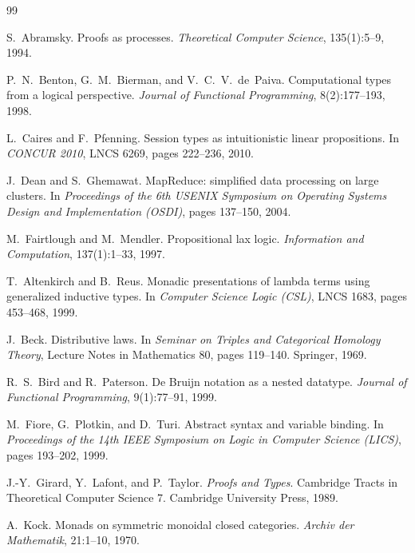 \documentclass[11pt]{article}
\theoremstyle{branddef}
\theoremstyle{brandplain}
\theoremstyle{brandrem}
\begin{document}
\begin{thebibliography}{99}\small\raggedright

S.~Abramsky.
\newblock Proofs as processes.
\newblock \emph{Theoretical Computer Science}, 135(1):5--9, 1994.

P.~N.~Benton, G.~M.~Bierman, and V.~C.~V.~de~Paiva.
\newblock Computational types from a logical perspective.
\newblock \emph{Journal of Functional Programming}, 8(2):177--193, 1998.

L.~Caires and F.~Pfenning.
\newblock Session types as intuitionistic linear propositions.
\newblock In \emph{CONCUR 2010}, LNCS 6269, pages 222--236, 2010.

J.~Dean and S.~Ghemawat.
\newblock MapReduce: simplified data processing on large clusters.
\newblock In \emph{Proceedings of the 6th USENIX Symposium on Operating Systems
Design and Implementation (OSDI)}, pages 137--150, 2004.

M.~Fairtlough and M.~Mendler.
\newblock Propositional lax logic.
\newblock \emph{Information and Computation}, 137(1):1--33, 1997.

T.~Altenkirch and B.~Reus.
\newblock Monadic presentations of lambda terms using generalized inductive
types.
\newblock In \emph{Computer Science Logic (CSL)}, LNCS 1683, pages 453--468,
1999.

J.~Beck.
\newblock Distributive laws.
\newblock In \emph{Seminar on Triples and Categorical Homology Theory}, Lecture
Notes in Mathematics 80, pages 119--140. Springer, 1969.

R.~S.~Bird and R.~Paterson.
\newblock De Bruijn notation as a nested datatype.
\newblock \emph{Journal of Functional Programming}, 9(1):77--91, 1999.

M.~Fiore, G.~Plotkin, and D.~Turi.
\newblock Abstract syntax and variable binding.
\newblock In \emph{Proceedings of the 14th IEEE Symposium on Logic in Computer
Science (LICS)}, pages 193--202, 1999.

J.-Y.~Girard, Y.~Lafont, and P.~Taylor.
\newblock \emph{Proofs and Types}.
\newblock Cambridge Tracts in Theoretical Computer Science 7. Cambridge
University Press, 1989.

A.~Kock.
\newblock Monads on symmetric monoidal closed categories.
\newblock \emph{Archiv der Mathematik}, 21:1--10, 1970.


\end{thebibliography}
\end{document}
